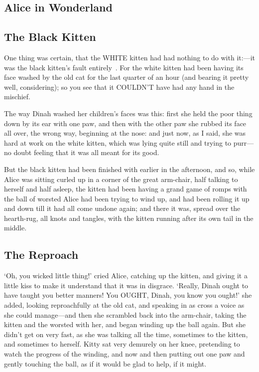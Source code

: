 \documentclass[master,tocprelim]{unrthesis}
\begin{document}
\begin{manuscript}
\chapter{Alice in Wonderland}

\section{The Black Kitten}
  One thing was certain, that the WHITE kitten had had nothing to
do with it:---it was the black kitten's fault entirely~\cite{aiw}.  For the
white kitten had been having its face washed by the old cat for
the last quarter of an hour (and bearing it pretty well,
considering); so you see that it COULDN'T have had any hand in
the mischief.

  The way Dinah washed her children's faces was this:  first she
held the poor thing down by its ear with one paw, and then with
the other paw she rubbed its face all over, the wrong way,
beginning at the nose:  and just now, as I said, she was hard at
work on the white kitten, which was lying quite still and trying
to purr---no doubt feeling that it was all meant for its good.

  But the black kitten had been finished with earlier in the
afternoon, and so, while Alice was sitting curled up in a corner
of the great arm-chair, half talking to herself and half asleep,
the kitten had been having a grand game of romps with the ball of
worsted Alice had been trying to wind up, and had been rolling it
up and down till it had all come undone again; and there it was,
spread over the hearth-rug, all knots and tangles, with the
kitten running after its own tail in the middle.

\section{The Reproach}

  `Oh, you wicked little thing!' cried Alice, catching up the
kitten, and giving it a little kiss to make it understand that it
was in disgrace.  `Really, Dinah ought to have taught you better
manners!  You OUGHT, Dinah, you know you ought!' she added,
looking reproachfully at the old cat, and speaking in as cross a
voice as she could manage---and then she scrambled back into the
arm-chair, taking the kitten and the worsted with her, and began
winding up the ball again.  But she didn't get on very fast, as
she was talking all the time, sometimes to the kitten, and
sometimes to herself.  Kitty sat very demurely on her knee,
pretending to watch the progress of the winding, and now and then
putting out one paw and gently touching the ball, as if it would
be glad to help, if it might.


\end{manuscript}
\end{document}
